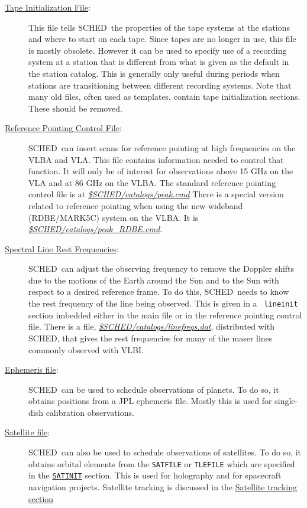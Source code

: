 \documentclass{report}
\newcommand{\sched}{{\sc SCHED}}
\newcommand{\schedb}{{\sc SCHED~}}
\begin{document}
\begin{description}
\item[
{\hyperref[SEC:TPINI]{Tape Initialization File}}:] This file tells
\schedb the properties of the tape systems at the stations and where
to start on each tape.  Since tapes are no longer in use, this file
is mostly obsolete.  However it can be used to specify use of a
recording system at a station that is different from what is given
as the default in the station catalog.  This is generally only useful
during periods when stations are transitioning between different
recording systems.  Note that many old files, often used as templates,
contain tape initialization sections.  These should be removed.

\item[
{\hyperref[SEC:REFPOINT]{Reference Pointing Control File}}:]
\schedb can insert scans for reference pointing at high frequencies on
the VLBA and VLA.  This file contains information needed to control
that function.  It will only be of interest for observations above 15 GHz
on the VLA and at 86 GHz on the VLBA.  The standard reference pointing
control file is at 
{\href{catalogs/peak.cmd}{{\sl \$SCHED/catalogs/peak.cmd}}}
There is a special version related to reference pointing when using the
new wideband (RDBE/MARK5C) system on the VLBA.  It is 
{\href{catalogs/peak\_RDBE.cmd}{{\sl \$SCHED/catalogs/peak\_RDBE.cmd}}}.

\item[
{\hyperref[SEC:LINE]{Spectral Line Rest Frequencies}}:] \schedb can
adjust the observing frequency to remove the Doppler shifts due to the
motions of the Earth around the Sun and to the Sun with respect to a
desired reference frame.  To do this, \schedb needs to know the rest
frequency of the line being observed.  This is given in a {\tt
lineinit} section imbedded either in the main file or in the reference
pointing control file.  There is a file, 
{\href{catalogs/linefreqs.dat}{{\sl \$SCHED/catalogs/linefreqs.dat}}},
distributed with \sched,
that gives the rest frequencies for many of the maser
lines commonly observed with VLBI.

\item[
{\hyperref[MP:EPHFILE]{Ephemeris file}}:] \schedb can be used to
schedule observations of planets.  To do so, it obtains positions from
a JPL ephemeris file.  Mostly this is used for single-dish calibration
observations.

\item[
{\hyperref[SEC:SATEL]{Satellite file}}:] \schedb can also be used
to schedule observations of satellites.  To do so, it obtains orbital
elements from the {\tt SATFILE} or {\tt TLEFILE} which are specified
in the {\hyperref[SEC:SATINIT]{\tt SATINIT}} section.  This is used for
holography and for spacecraft navigation projects.  Satellite tracking
is discussed in the {\hyperref[SEC:SATEL]{Satellite tracking section}}

\end{description}
\end{document}
